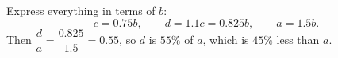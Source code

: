 Express everything in terms of $b$:
\[c=0.75b,\qquad d=1.1c=0.825b,\qquad a=1.5b.\]
Then $\dfrac da=\dfrac{0.825}{1.5}=0.55$, so $d$ is $55\%$ of $a$, which is $\boxed{45\%}$ less than $a$.
